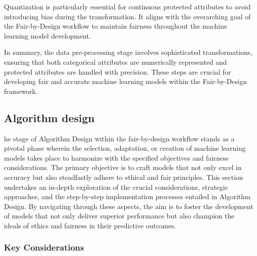 Quantization is particularly essential for continuous protected attributes to avoid introducing bias during the transformation. It aligns with the overarching goal of the Fair-by-Design workflow to maintain fairness throughout the machine learning model development.

In summary, the data pre-processing stage involves sophisticated transformations, ensuring that both categorical attributes are numerically represented and protected attributes are handled with precision. These steps are crucial for developing fair and accurate machine learning models within the Fair-by-Design framework.

\subsection{Algorithm design}
\label{subsection:algorithm}

he stage of Algorithm Design within the fair-by-design workflow stands as a pivotal phase wherein the selection, adaptation, or creation of machine learning models takes place to harmonize with the specified objectives and fairness considerations. The primary objective is to craft models that not only excel in accuracy but also steadfastly adhere to ethical and fair principles. This section undertakes an in-depth exploration of the crucial considerations, strategic approaches, and the step-by-step implementation processes entailed in Algorithm Design. By navigating through these aspects, the aim is to foster the development of models that not only deliver superior performance but also champion the ideals of ethics and fairness in their predictive outcomes.

\subsubsection{Key Considerations}


